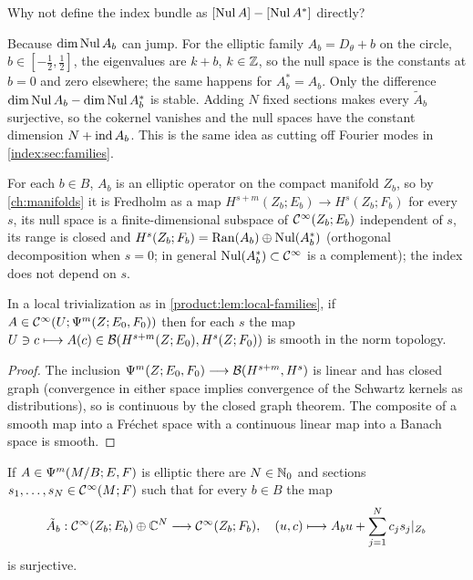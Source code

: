 \begin{question}
  Why not define the index bundle as $[\operatorname{Nul} A]-[\operatorname{Nul} A^*]$ directly?
\end{question}
\begin{answer}
  Because $\dim\operatorname{Nul} A_b$ can jump. For the elliptic family
  $A_b=D_\theta+b$ on the circle, $b\in[-\frac12,\frac12]$, the eigenvalues are
  $k+b$, $k\in\mathbb{Z}$, so the null space is the constants at $b=0$ and zero
  elsewhere; the same happens for $A_b^*=A_b$. Only the difference $\dim\operatorname{Nul} A_b-\dim\operatorname{Nul} A_b^*$ is stable. Adding $N$ fixed
  sections makes every $\tilde A_b$ surjective, so the cokernel vanishes and the
  null spaces have the constant dimension $N+\operatorname{ind} A_b$. This is the same idea as
  cutting off Fourier modes in \cref{index:sec:families}.
\end{answer}

For each $b\in B$, $A_b$ is an elliptic operator on the compact manifold $Z_b$,
so by \cref{ch:manifolds} it is Fredholm as a map
$H^{s+m}(Z_b;E_b)\longrightarrow H^s(Z_b;F_b)$ for every $s$, its null space is a
finite-dimensional subspace of $\mathcal{C}^\infty(Z_b;E_b)$ independent of $s$, its range is
closed and $H^s(Z_b;F_b)=\operatorname{Ran}(A_b)\oplus\operatorname{Nul}(A_b^*)$ (orthogonal decomposition
when $s=0$; in general $\operatorname{Nul}(A_b^*)\subset\mathcal{C}^\infty$ is a complement); the index does
not depend on $s$.

\begin{lemma}\label{product:lem:norm-continuity}
In a local trivialization as in \cref{product:lem:local-families}, if
$A\in\mathcal{C}^\infty(U;\Psi^{m}(Z;E_0,F_0))$ then for each $s$ the map
$U\ni c\longmapsto A(c)\in\mathcal{B}(H^{s+m}(Z;E_0),H^s(Z;F_0))$ is smooth in the norm
topology.
\end{lemma}

\begin{proof}
The inclusion $\Psi^{m}(Z;E_0,F_0)\longrightarrow\mathcal{B}(H^{s+m},H^s)$ is linear and
has closed graph (convergence in either space implies convergence of the
Schwartz kernels as distributions), so is continuous by the closed graph theorem.
The composite of a smooth map into a Fréchet space with a continuous linear map
into a Banach space is smooth.
\end{proof}

\begin{lemma}[Stabilization]\label{product:lem:stabilization}
If $A\in\Psi^{m}(M/B;E,F)$ is elliptic there are $N\in\mathbb{N}_0$ and sections
$s_1,\dots,s_N\in\mathcal{C}^\infty(M;F)$ such that for every $b\in B$ the map
\begin{equation}\label{product:eq:stabilized}
\tilde A_b:\mathcal{C}^\infty(Z_b;E_b)\oplus\mathbb{C}^N\longrightarrow\mathcal{C}^\infty(Z_b;F_b),\quad
(u,c)\longmapsto A_bu+\sum_{j=1}^Nc_js_j|_{Z_b}
\end{equation}
is surjective.
\end{lemma}

